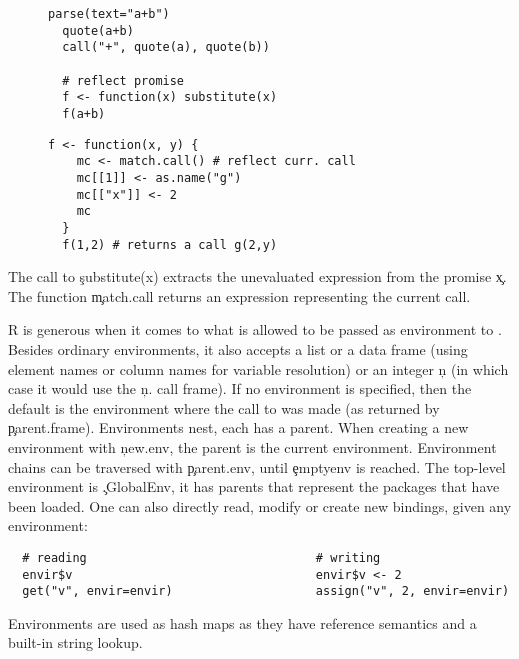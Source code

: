 \documentclass[review,screen,acmsmall]{acmart}
\begin{document}
\vspace*{-2mm}
\begin{figure}[htb]
\begin{minipage}{.49\textwidth}
\begin{lstlisting}[caption={Examples of calls producing expression \c{a+b}}]
  parse(text="a+b")
  quote(a+b)
  call("+", quote(a), quote(b))

  # reflect promise
  f <- function(x) substitute(x)
  f(a+b)
  \end{lstlisting}
\end{minipage}
\begin{minipage}{.49\textwidth}
  \begin{lstlisting}[caption={Example of a call reflection}]
  f <- function(x, y) {
    mc <- match.call() # reflect curr. call
    mc[[1]] <- as.name("g")
    mc[["x"]] <- 2
    mc
  }
  f(1,2) # returns a call g(2,y)
  \end{lstlisting}
\end{minipage}
\end{figure}

\vspace*{-2mm}
\noindent The call to \c{substitute(x)} extracts the unevaluated expression from the
promise \c{x}. The function \c{match.call} returns an expression representing the current call.

R is generous when it comes to what is allowed to be passed as environment to
\eval. Besides ordinary environments, it also accepts a list or a data
frame (using element names or column names for variable resolution) or an
integer \c{n} (in which case it would use the \c{n.} call frame). If no
environment is specified, then the default is the environment where the call to
\eval was made (as returned by \c{parent.frame}).
%
Environments nest, each has a parent. When creating a new environment with
\c{new.env}, the parent is the current environment. Environment chains can be
traversed with \c{parent.env}, until \c{emptyenv} is reached. The top-level
environment is \c{.GlobalEnv}, it has parents that represent the packages that
have been loaded. One can also directly read, modify or create new bindings,
given any environment:
%
\begin{lstlisting}
  # reading                                # writing
  envir$v                                  envir$v <- 2
  get("v", envir=envir)                    assign("v", 2, envir=envir)
\end{lstlisting}
%
\noindent Environments are used as hash maps as they have reference semantics
and a built-in string lookup.
\end{document}
